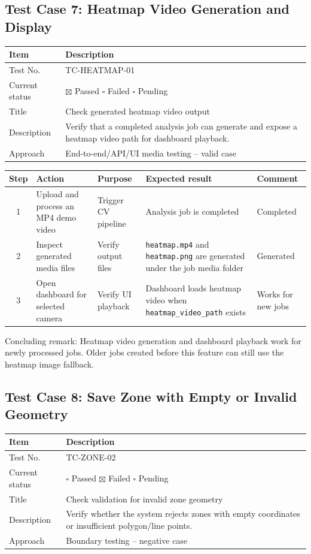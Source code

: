 \documentclass[12pt,a4paper]{report}
\begin{document}
\subsection{Test Case 7: Heatmap Video Generation and Display}
\begin{longtable}{|p{4cm}|p{10cm}|}
\hline
\rowcolor{HeaderBlue}\textbf{Item} & \textbf{Description} \\
\hline
Test No. & TC-HEATMAP-01 \\
\hline
Current status & $\boxtimes$ Passed \quad $\square$ Failed \quad $\square$ Pending \\
\hline
Title & Check generated heatmap video output \\
\hline
Description & Verify that a completed analysis job can generate and expose a heatmap video path for dashboard playback. \\
\hline
Approach & End-to-end/API/UI media testing -- valid case \\
\hline
\end{longtable}

\begin{longtable}{|c|p{3.6cm}|p{3.6cm}|p{3.6cm}|p{2cm}|}
\hline
\rowcolor{HeaderBlue}
\textbf{Step} & \textbf{Action} & \textbf{Purpose} & \textbf{Expected result} & \textbf{Comment} \\
\hline
1 & Upload and process an MP4 demo video & Trigger CV pipeline & Analysis job is completed & Completed \\
\hline
2 & Inspect generated media files & Verify output files & \texttt{heatmap.mp4} and \texttt{heatmap.png} are generated under the job media folder & Generated \\
\hline
3 & Open dashboard for selected camera & Verify UI playback & Dashboard loads heatmap video when \texttt{heatmap\_video\_path} exists & Works for new jobs \\
\hline
\end{longtable}

Concluding remark: Heatmap video generation and dashboard playback work for newly processed jobs. Older jobs created before this feature can still use the heatmap image fallback.

\subsection{Test Case 8: Save Zone with Empty or Invalid Geometry}
\begin{longtable}{|p{4cm}|p{10cm}|}
\hline
\rowcolor{HeaderBlue}\textbf{Item} & \textbf{Description} \\
\hline
Test No. & TC-ZONE-02 \\
\hline
Current status & $\square$ Passed \quad $\boxtimes$ Failed \quad $\square$ Pending \\
\hline
Title & Check validation for invalid zone geometry \\
\hline
Description & Verify whether the system rejects zones with empty coordinates or insufficient polygon/line points. \\
\hline
Approach & Boundary testing -- negative case \\
\hline
\end{longtable}
\end{document}
